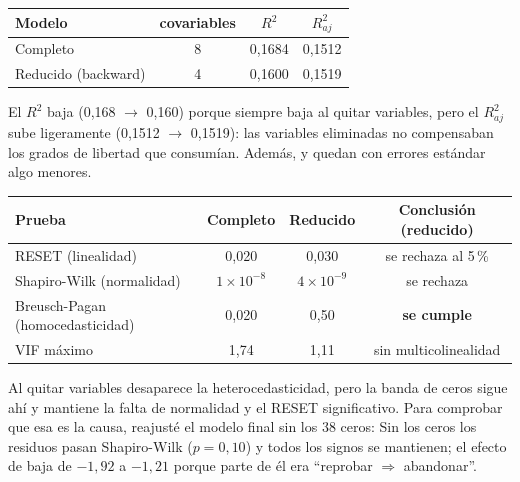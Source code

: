 \begin{center}\small
\begin{tabular}{lccc}
\toprule
Modelo & covariables & $R^2$ & $R^2_{aj}$ \\ \midrule
Completo & 8 & 0,1684 & 0,1512 \\
Reducido (backward) & 4 & 0,1600 & 0,1519 \\ \bottomrule
\end{tabular}
\end{center}
El $R^2$ baja (0,168 $\to$ 0,160) porque siempre baja al quitar variables, pero el $R^2_{aj}$ sube
ligeramente (0,1512 $\to$ 0,1519): las variables eliminadas no compensaban los grados de libertad que
consumían. Además,  y  quedan con errores estándar algo menores.


\begin{center}\small
\begin{tabular}{lccc}
\toprule
Prueba & Completo & Reducido & Conclusión (reducido) \\ \midrule
RESET (linealidad) & 0,020 & 0,030 & se rechaza al 5\,\% \\
Shapiro-Wilk (normalidad) & $1\times10^{-8}$ & $4\times10^{-9}$ & se rechaza \\
Breusch-Pagan (homocedasticidad) & 0,020 & 0,50 & \textbf{se cumple} \\
VIF máximo & 1,74 & 1,11 & sin multicolinealidad \\ \bottomrule
\end{tabular}
\end{center}
Al quitar variables desaparece la heterocedasticidad, pero la banda de ceros sigue ahí y mantiene la falta de
normalidad y el RESET significativo. Para comprobar que esa es la causa, reajusté el modelo final sin los 38
ceros:
Sin los ceros los residuos pasan Shapiro-Wilk ($p=0,10$) y todos los signos se mantienen; el efecto de
 baja de $-1,92$ a $-1,21$ porque parte de él era ``reprobar $\Rightarrow$
abandonar''.

